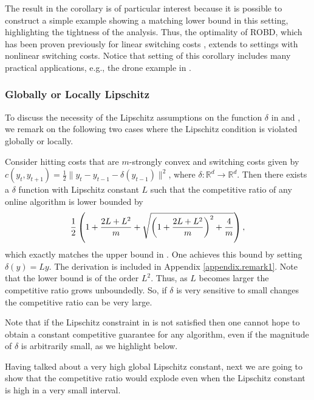 The result in the corollary is of particular interest because it is possible to construct a simple example showing a matching lower bound in this setting, highlighting the tightness of the analysis.  Thus, the optimality of ROBD, which has been proven previously for linear switching costs \citep{goel2019beyond}, extends to settings with nonlinear switching costs. Notice that setting of this corollary includes many practical applications, e.g., the drone example in .

\subsubsection{Globally or Locally Lipschitz}
To discuss the necessity of the Lipschitz assumptions on the function $\delta$ in  and , we remark on the following two cases where the Lipschitz condition is violated globally or locally.

\begin{remark}\label{remark.1}
Consider hitting costs that are $m$-strongly convex and  switching costs given by $c(y_t,y_{t+1})=\frac{1}{2}\|y_t-y_{t-1}-\delta(y_{t-1})\|^2$, where $\delta:\mathbb{R}^d\to\mathbb{R}^d$. Then there exists a $\delta$ function with Lipschitz constant $L$ such that the competitive ratio of any online algorithm is lower bounded by 
\begin{align}
    \frac{1}{2}\left(1+\frac{2L+L^2}{m}+\sqrt{\left(1+\frac{2L+L^2}{m}\right)^2+\frac{4}{m}}\right),\notag
\end{align}
which exactly matches the upper bound in . One achieves this bound by setting $\delta(y)=Ly$.  The derivation is included in Appendix \ref{appendix.remark1}. Note that the lower bound is of the order $L^2$. Thus, as $L$ becomes larger the competitive ratio grows unboundedly. So, if $\delta$ is very sensitive to small changes the competitive ratio can be very large.
\end{remark}

Note that if the Lipschitz constraint in  is not satisfied then one cannot hope to obtain a constant competitive guarantee for any algorithm, even if the magnitude of $\delta$ is arbitrarily small, as we highlight below.

Having talked about a very high global Lipschitz constant, next we are going to show that the competitive ratio would explode even when the Lipschitz constant is high in a very small interval. 

